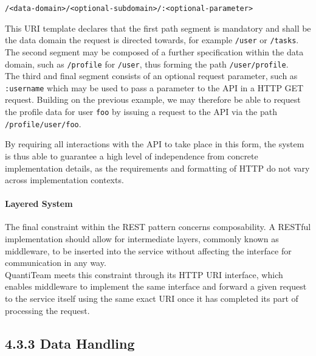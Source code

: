 \texttt{/\textless{}data-domain\textgreater{}/\textless{}optional-subdomain\textgreater{}/:\textless{}optional-parameter\textgreater{}}

This URI template declares that the first path segment is mandatory and
shall be the data domain the request is directed towards, for example
\texttt{/user} or \texttt{/tasks}.\\
The second segment may be composed of a further specification within the
data domain, such as \texttt{/profile} for \texttt{/user}, thus forming
the path \texttt{/user/profile}.\\
The third and final segment consists of an optional request parameter,
such as \texttt{:username} which may be used to pass a parameter to the
API in a HTTP GET request. Building on the previous example, we may
therefore be able to request the profile data for user \texttt{foo} by
issuing a request to the API via the path \texttt{/profile/user/foo}.

By requiring all interactions with the API to take place in this form,
the system is thus able to guarantee a high level of independence from
concrete implementation details, as the requirements and formatting of
HTTP do not vary across implementation contexts.

\paragraph{Layered System}\label{layered-system}

The final constraint within the REST pattern concerns composability. A
RESTful implementation should allow for intermediate layers, commonly
known as middleware, to be inserted into the service without affecting
the interface for communication in any
way\cite{1rest}.\\
QuantiTeam meets this constraint through its HTTP URI interface, which
enables middleware to implement the same interface and forward a given
request to the service itself using the same exact URI once it has
completed its part of processing the request.

\subsection{4.3.3 Data Handling}\label{data-handling}

